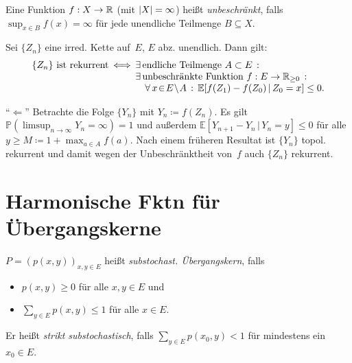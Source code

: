 \documentclass{cheat-sheet}
\renewcommand{\P}{\mathbb{P}} %
\newcommand{\E}{\mathbb{E}} %
\begin{document}
\begin{defn}
  Eine Funktion $f : X \to \mathbb{R}$ (mit $\lvert X\rvert = \infty$) heißt \emph{unbeschränkt}, falls ${\sup}_{x \in B} f(x) = \infty$ für jede unendliche Teilmenge $B \subseteq X$.
\end{defn}

\begin{satz}
  Sei $\{ Z_n \}$ eine irred. Kette auf~$E$, $E$ abz. unendlich.
  Dann gilt:
  \[
    \arraycolsep=1pt
    \begin{array}{r c l}
      \{ Z_n \} \text{ ist rekurrent}
      &\iff&
      \ex{\text{endliche Teilmenge } A \subset E} \\
      && \ex{\text{unbeschränkte Funktion } f : E \to \R_{\geq 0}} \\
      && \quad \fa{x \!\in\! E \!\setminus\! A} \E[ f(Z_1) - f(Z_0) \,|\, Z_0 = x ] \leq 0.
    \end{array}
  \]
\end{satz}

\begin{beweisskizze}
  "`$\Leftarrow$"'
  Betrachte die Folge $\{ Y_n \}$ mit $Y_n \coloneqq f(Z_n)$.
  Es gilt $\P({\limsup}_{n \to \infty} Y_n = \infty) = 1$ und außerdem $\E[ Y_{n+1} - Y_n \,|\, Y_n = y ] \leq 0$ für alle $y \geq M \coloneqq 1 + {\max}_{a \in A} f(a)$.
  Nach einem früheren Resultat ist $\{ Y_n \}$ topol. rekurrent und damit wegen der Unbeschränktheit von~$f$ auch $\{ Z_n \}$ rekurrent.
\end{beweisskizze}

\section{Harmonische Fktn für Übergangskerne}


\begin{defn}
  $P = (p(x, y))_{x, y \in E}$ heißt \emph{substochast. Übergangskern}, falls
  \begin{itemize}
    \item $p(x, y) \geq 0$ für alle $x, y \in E$ und
    \item ${\sum}_{y \in E} p(x, y) \leq 1$ für alle $x \in E$.
  \end{itemize}
  Er heißt \textit{strikt substochastisch}, falls ${\sum}_{y \in E} p(x_0, y) < 1$ für mindestens ein $x_0 \in E$.
\end{defn}
\end{document}
